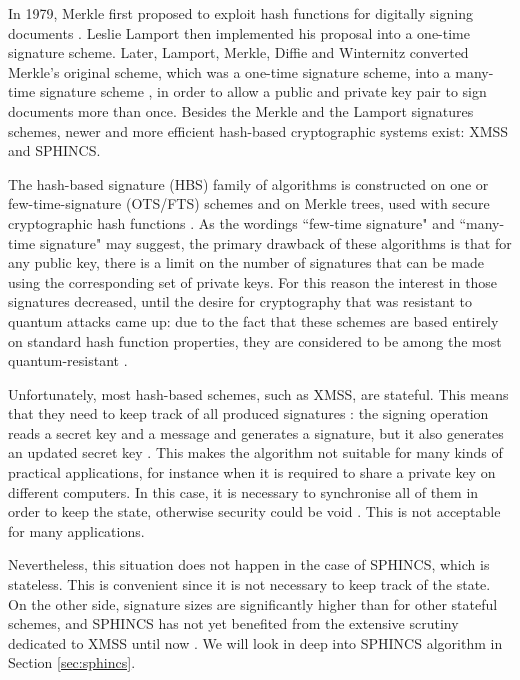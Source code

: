 \documentclass[a4paper,12pt]{article}
\begin{document}
In 1979, Merkle first proposed to exploit hash functions for digitally signing documents \cite{30_Merkle}. Leslie  
Lamport \cite{31_Lamport} then implemented his proposal into a one-time signature scheme. Later, Lamport, Merkle, Diffie and Winternitz converted Merkle's original scheme, which was a one-time signature scheme, into a many-time signature scheme \cite{10_postquantum_keyexchange}, in order to allow a public and private key pair to sign documents more than once.
Besides the Merkle and the Lamport signatures schemes, newer and more efficient hash-based cryptographic systems exist: XMSS and SPHINCS.

The hash-based signature (HBS) family of algorithms is constructed on one or few-time-signature (OTS/FTS) schemes and on Merkle trees, used with secure cryptographic hash functions \cite{5_postquantum_signature_usecase}.
As the wordings ``few-time signature" and ``many-time signature" may suggest, the primary drawback of these algorithms is that for any public key, there is a limit on the number of signatures that can be made using the corresponding set of private keys. For this reason the interest in those signatures decreased, until the desire for cryptography that was resistant to quantum attacks came up: due to the fact that these schemes are based entirely on standard hash function properties, they are considered to be among the most quantum-resistant \cite{10_postquantum_keyexchange}.

Unfortunately, most hash-based schemes, such as XMSS, are stateful.
This means that they need to keep track of all produced signatures \cite{3_SPHINCS_secondpaper}: the signing operation reads a secret key and a message and generates a signature, but it also generates an updated secret key \cite{1_sphincspaper}.
This makes the algorithm not suitable for many kinds of practical applications, for instance when it is required to share a private key on different computers. In this case, it is necessary to synchronise all of them in order to keep the state, otherwise security could be void \cite{4_wings}.
This is not acceptable for many applications.

Nevertheless, this situation does not happen in the case of SPHINCS, which is stateless. This is convenient since it is not necessary to keep track of the state. On the other side, signature sizes are significantly higher than for other stateful schemes, and SPHINCS has not yet benefited from the extensive scrutiny dedicated to XMSS until now \cite{9_postquantum_auth_openssl}. We will look in deep into SPHINCS algorithm in Section \ref{sec:sphincs}.
\end{document}
